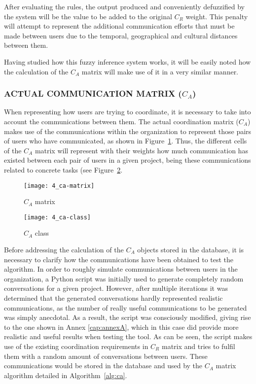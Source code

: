 \begin{itemize}
	After evaluating the rules, the output produced and conveniently defuzzified by the system will be the value to be added to the original $C_R$ weight. This penalty will attempt to represent the additional communication efforts that must be made between users due to the temporal, geographical and cultural distances between them.\newline
	
	Having studied how this fuzzy inference system works, it will be easily noted how the calculation of the $C_A$ matrix will make use of it in a very similar manner.

\end{itemize}

\subsubsection{ACTUAL COMMUNICATION MATRIX ($C_A$)}

When representing how users are trying to coordinate, it is necessary to take into account the communications between them. The actual coordination matrix ($C_A$) makes use of the communications within the organization to represent those pairs of users who have communicated, as shown in Figure~\ref{fig:ca-matrix}. Thus, the different cells of the $C_A$ matrix will represent with their weights how much communication has existed between each pair of users in a given project, being these communications related to concrete tasks (see Figure~\ref{fig:ca-class}.

\begin{figure}
	\centering
	\texttt{[image: 4\_ca-matrix]}
	\caption[$C_A$ matrix]{$C_A$ matrix}
	\label{fig:ca-matrix}
\end{figure}

\begin{figure}
	\centering
	\texttt{[image: 4\_ca-class]}
	\caption[$C_A$ class]{$C_A$ class}
	\label{fig:ca-class}
\end{figure}

Before addressing the calculation of the $C_A$ objects stored in the database, it is necessary to clarify how the communications have been obtained to test the algorithm. In order to roughly simulate communications between users in the organization, a Python script was initially used to generate completely random conversations for a given project. However, after multiple iterations it was determined that the generated conversations hardly represented realistic communications, as the number of really useful communications to be generated was simply anecdotal. As a result, the script was consciously modified, giving rise to the one shown in Annex \ref{cap:annexA}, which in this case did provide more realistic and useful results when testing the tool. As can be seen, the script makes use of the existing coordination requirements in $C_R$ matrix and tries to fulfil them with a random amount of conversations between users. These communications would be stored in the database and used by the $C_A$ matrix algorithm detailed in Algorithm~\ref{alg:ca}.

